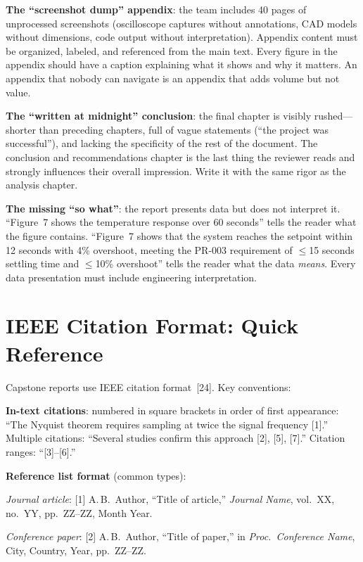 \textbf{The ``screenshot dump'' appendix}: the team includes 40 pages of unprocessed screenshots (oscilloscope captures without annotations, CAD models without dimensions, code output without interpretation). Appendix content must be organized, labeled, and referenced from the main text. Every figure in the appendix should have a caption explaining what it shows and why it matters. An appendix that nobody can navigate is an appendix that adds volume but not value.

\textbf{The ``written at midnight'' conclusion}: the final chapter is visibly rushed---shorter than preceding chapters, full of vague statements (``the project was successful''), and lacking the specificity of the rest of the document. The conclusion and recommendations chapter is the last thing the reviewer reads and strongly influences their overall impression. Write it with the same rigor as the analysis chapter.

\textbf{The missing ``so what''}: the report presents data but does not interpret it. ``Figure~7 shows the temperature response over 60 seconds'' tells the reader what the figure contains. ``Figure~7 shows that the system reaches the setpoint within 12 seconds with 4\% overshoot, meeting the PR-003 requirement of $\leq$15 seconds settling time and $\leq$10\% overshoot'' tells the reader what the data \emph{means}. Every data presentation must include engineering interpretation.



\section{IEEE Citation Format: Quick Reference}
Capstone reports use IEEE citation format~[24]. Key conventions:

\textbf{In-text citations}: numbered in square brackets in order of first appearance: ``The Nyquist theorem requires sampling at twice the signal frequency [1].'' Multiple citations: ``Several studies confirm this approach [2], [5], [7].'' Citation ranges: ``[3]--[6].''

\textbf{Reference list format} (common types):

\textit{Journal article}: [1] A.\,B.\ Author, ``Title of article,'' \textit{Journal Name}, vol.\ XX, no.\ YY, pp.\ ZZ--ZZ, Month Year.

\textit{Conference paper}: [2] A.\,B.\ Author, ``Title of paper,'' in \textit{Proc.\ Conference Name}, City, Country, Year, pp.\ ZZ--ZZ.

